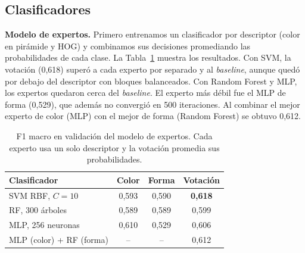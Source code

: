 \subsection{Clasificadores}
\label{sec:Resultados_clasificadores}

\textbf{Modelo de expertos.} Primero entrenamos un clasificador por descriptor (color en pirámide y HOG) y combinamos sus decisiones promediando las probabilidades de cada clase. La Tabla~\ref{tab:expertos} muestra los resultados. Con SVM, la votación (0,618) superó a cada experto por separado y al \textit{baseline}, aunque quedó por debajo del descriptor con bloques balanceados. Con Random Forest y MLP, los expertos quedaron cerca del \textit{baseline}. El experto más débil fue el MLP de forma (0,529), que además no convergió en 500 iteraciones. Al combinar el mejor experto de color (MLP) con el mejor de forma (Random Forest) se obtuvo 0,612.

\begin{table}[t]
  \centering
  \small
  \caption{F1 macro en validación del modelo de expertos. Cada experto usa un solo descriptor y la votación promedia sus probabilidades.}
  \label{tab:expertos}
  \begin{tabular}{@{}lccc@{}}
    \toprule
    Clasificador & Color & Forma & Votación \\
    \midrule
    SVM RBF, $C=10$          & 0,593 & 0,590 & \textbf{0,618} \\
    RF, 300 árboles          & 0,589 & 0,589 & 0,599 \\
    MLP, 256 neuronas        & 0,610 & 0,529 & 0,606 \\
    MLP (color) + RF (forma) & --    & --    & 0,612 \\
    \bottomrule
  \end{tabular}
\end{table}

